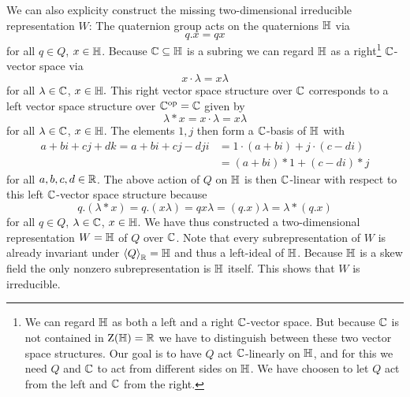 \begin{example}
  We can also explicity construct the missing two-dimensional irreducible representation $W$:
  The quaternion group acts on the quaternions $\mathbb{H}$ via
  \[
      q.x
    = qx
  \]
  for all $q \in Q$, $x \in \mathbb{H}$.
  Because $\mathbb{C} \subseteq \mathbb{H}$ is a subring we can regard $\mathbb{H}$ as a right\footnote{
  We can regard $\mathbb{H}$ as both a left and a right $\mathbb{C}$-vector space.
  But because $\mathbb{C}$ is not contained in $\operatorname{Z}(\mathbb{H}) = \mathbb{R}$ we have to distinguish between these two vector space structures.
  Our goal is to have $Q$ act $\mathbb{C}$-linearly on $\mathbb{H}$, and for this we need $Q$ and $\mathbb{C}$ to act from different sides on $\mathbb{H}$.
  We have choosen to let $Q$ act from the left and $\mathbb{C}$ from the right.
  }
  $\mathbb{C}$-vector space via
  \[
      x \cdot \lambda
    = x \lambda
  \]
  for all $\lambda \in \mathbb{C}$, $x \in \mathbb{H}.$
  This right vector space structure over $\mathbb{C}$ corresponds to a left vector space structure over $\mathbb{C}^{\operatorname{op}} = \mathbb{C}$ given by
  \[
      \lambda * x
    = x \cdot \lambda
    = x \lambda
  \]
  for all $\lambda \in \mathbb{C}$, $x \in \mathbb{H}$.
  The elements $1, j$ then form a $\mathbb{C}$-basis of $\mathbb{H}$ with
  \begin{align*}
        a + bi + cj + dk
     =  a + bi + cj - dji
    &=  1 \cdot (a + bi) + j \cdot (c - di) \\
    &=  (a + bi) * 1 + (c - di) * j
  \end{align*}
  for all $a, b, c, d \in \mathbb{R}$.
  The above action of $Q$ on $\mathbb{H}$ is then $\mathbb{C}$-linear with respect to this left $\mathbb{C}$-vector space structure because
  \[
      q.(\lambda * x)
    = q.(x \lambda) 
    = q x \lambda
    = (q.x) \lambda
    = \lambda * (q.x)
  \]
  for all $q \in Q$, $\lambda \in \mathbb{C}$, $x \in \mathbb{H}$.
  We have thus constructed a two-dimensional representation $W = \mathbb{H}$ of $Q$ over $\mathbb{C}$.
  Note that every subrepresentation of $W$ is already invariant under $\left\langle Q \right\rangle_{\mathbb{R}} = \mathbb{H}$ and thus a left-ideal of $\mathbb{H}$.
  Because $\mathbb{H}$ is a skew field the only nonzero subrepresentation is $\mathbb{H}$ itself.
  This shows that $W$ is irreducible.
  

\end{example}
